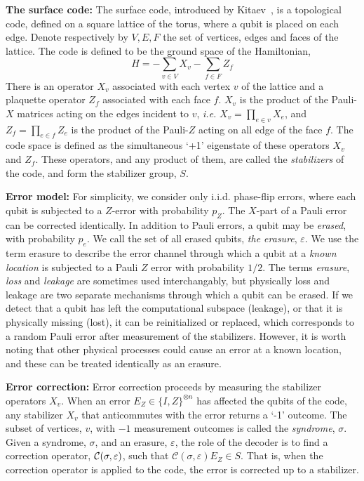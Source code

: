 \documentclass[a4paper, 10pt, accepted=2021-11-03]{quantumarticle}
\newcommand{\e}{\varepsilon}
\begin{document}
\medskip
{\bf The surface code: }
The surface code, introduced by Kitaev~\cite{kitaev2003fault}, is a topological code, 
defined on a square lattice of the torus, where a qubit is placed on each edge. 
Denote respectively by $V,E,F$ the set of vertices, edges and faces of the lattice.
The code is defined to be the ground space of the Hamiltonian,
$$
H = -\sum_{v \in V} X_v - \sum_{f \in F} Z_f
$$
There is an operator $X_v$ associated with each vertex $v$ of the lattice
and a plaquette operator $Z_f$ associated with each face $f$.
$X_v$ is the product of the Pauli-$X$ matrices acting on the edges incident to $v$,
{\em i.e.} $X_v = \prod_{e \in v} X_e$, and 
$Z_f = \prod_{e \in f} Z_e$ is the product of the Pauli-$Z$ acting on all edge of the face $f$.
The code space is defined as the simultaneous `+1' eigenstate of these operators $X_v$ and $Z_f$. 
These operators, and any product of them, are called the {\em stabilizers} of the code, and form
the stabilizer group, $S$.

\medskip
{\bf Error model: }
For simplicity, we consider only i.i.d. phase-flip errors, where each qubit is subjected 
to a $Z$-error with probability $p_Z$. The $X$-part of a Pauli error 
can be corrected identically. In addition to Pauli errors, a qubit may be {\em erased}, with probability $p_e$. 
We call the set of all erased qubits, {\em the erasure}, $\e$. 
We use the term erasure to describe the error channel through
which a qubit at a {\em known location} is subjected to a Pauli $Z$ error with probability $1/2$.
The terms {\em erasure}, {\em loss} and {\em leakage} are sometimes used interchangably, 
but physically loss and leakage are two separate mechanisms through which a qubit can be erased.
If we detect that a qubit has left the computational subspace (leakage), or that it is physically missing (lost),
it can be reinitialized or replaced, which corresponds to a random Pauli error after measurement of the stabilizers. 
However, it is worth noting that other physical processes could cause an error at a known location, 
and these can be treated identically as an erasure.

\medskip
{\bf Error correction: }
Error correction proceeds by measuring the stabilizer 
operators $X_v$. When an error $E_Z \in \{I, Z\}^{\otimes n}$ has affected the qubits of the code, 
any stabilizer $X_v$ that anticommutes with the error returns a `-1' outcome. The subset of vertices, $v$, with $-1$ measurement outcomes is called the {\em syndrome}, $\sigma$. 
Given a syndrome, $\sigma$, and an erasure, $\e$, the role of the decoder is to find a correction 
operator, $\cal{C}(\sigma, \e)$, such that $\mathcal{C}(\sigma, \e) E_Z \in S$. That is, when the correction operator is applied to the code, the error is corrected up to a stabilizer. 
\end{document}
